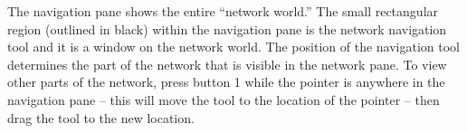 The navigation pane shows the entire ``network world.''  The small
rectangular region (outlined in black) within the navigation pane is the
network navigation tool and it is a window on the network world.  The
position of the navigation tool determines the part of the network that is
visible in the network pane.  To view other parts of the network, press
button 1 while the pointer is anywhere in the navigation pane -- this will
move the tool to the location of the pointer --  then drag the tool to the
new location.



